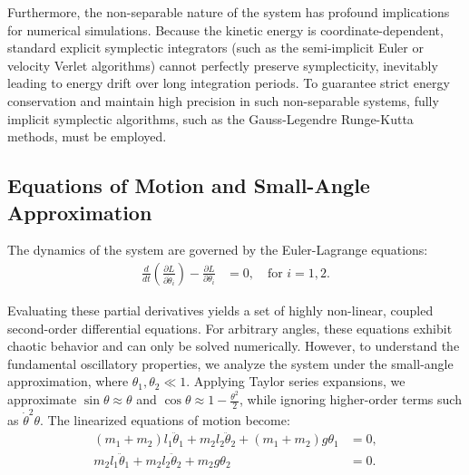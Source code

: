 \documentclass[12pt, a4paper, twoside]{article}
\begin{document}
Furthermore, the non-separable nature of the system has profound implications for numerical simulations. Because the kinetic energy is coordinate-dependent, standard explicit symplectic integrators (such as the semi-implicit Euler or velocity Verlet algorithms) cannot perfectly preserve symplecticity, inevitably leading to energy drift over long integration periods. To guarantee strict energy conservation and maintain high precision in such non-separable systems, fully implicit symplectic algorithms, such as the Gauss-Legendre Runge-Kutta methods, must be employed.

\subsection{Equations of Motion and Small-Angle Approximation}
The dynamics of the system are governed by the Euler-Lagrange equations:
\begin{align*}
\frac{d}{dt}\left(\frac{\partial L}{\partial \dot{\theta}_i}\right) - \frac{\partial L}{\partial \theta_i} &= 0, \quad \text{for } i = 1, 2.
\end{align*}

Evaluating these partial derivatives yields a set of highly non-linear, coupled second-order differential equations. For arbitrary angles, these equations exhibit chaotic behavior and can only be solved numerically. However, to understand the fundamental oscillatory properties, we analyze the system under the small-angle approximation, where $\theta_1, \theta_2 \ll 1$. Applying Taylor series expansions, we approximate $\sin\theta \approx \theta$ and $\cos\theta \approx 1 - \frac{\theta^2}{2}$, while ignoring higher-order terms such as $\dot{\theta}^2\theta$. The linearized equations of motion become:
\begin{equation}
\begin{aligned}
(m_1 + m_2)l_1 \ddot{\theta}_1 + m_2 l_2 \ddot{\theta}_2 + (m_1 + m_2)g \theta_1 &= 0, \\
m_2 l_1 \ddot{\theta}_1 + m_2 l_2 \ddot{\theta}_2 + m_2 g \theta_2 &= 0.
\end{aligned}
\end{equation}
\end{document}
